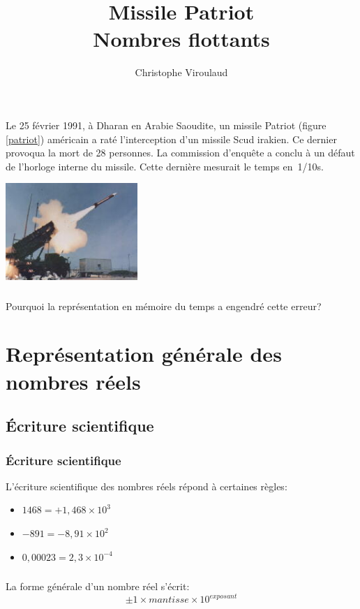 \documentclass[svgnames,11pt]{beamer}
\author[]{Christophe Viroulaud}
\title{Missile Patriot \\Nombres flottants}
\date{\framebox{\textbf{DonRep 04}}}
\institute{Première - NSI}
\begin{document}
\begin{frame}
    \titlepage
\end{frame}
\begin{frame}
    \frametitle{}

    Le 25 février 1991, à Dharan en Arabie Saoudite, un missile Patriot (figure \ref{patriot}) américain a raté l’interception d’un missile Scud irakien. Ce dernier provoqua la mort de 28 personnes. La commission d'enquête a conclu à un défaut de l'horloge interne du missile. Cette dernière mesurait le temps en~1/10s.
    \begin{center}
        \centering
        \includegraphics[width=5cm]{ressources/patriot.jpg}
        \label{patriot}
    \end{center}

\end{frame}
\begin{frame}
    \frametitle{}

    \begin{center}
        \begin{framed}
            \centering Pourquoi la représentation en mémoire du temps a engendré cette erreur?
        \end{framed}
    \end{center}

\end{frame}
\section{Représentation générale des nombres réels}
\subsection{Écriture scientifique}
\begin{frame}
    \frametitle{Écriture scientifique}

    L'écriture scientifique des nombres réels répond à certaines règles:
    \begin{itemize}
        \item $1468=+1,468×10^3$
        \item $-891=-8,91×10^2$
        \item $0,00023=2,3×10^{-4}$
    \end{itemize}

\end{frame}
\begin{frame}
    \frametitle{}

    \begin{aretenir}[]
        La forme générale d'un nombre réel s'écrit:
        $$\pm 1×mantisse×10^{exposant}$$
    \end{aretenir}

\end{frame}
\end{document}
